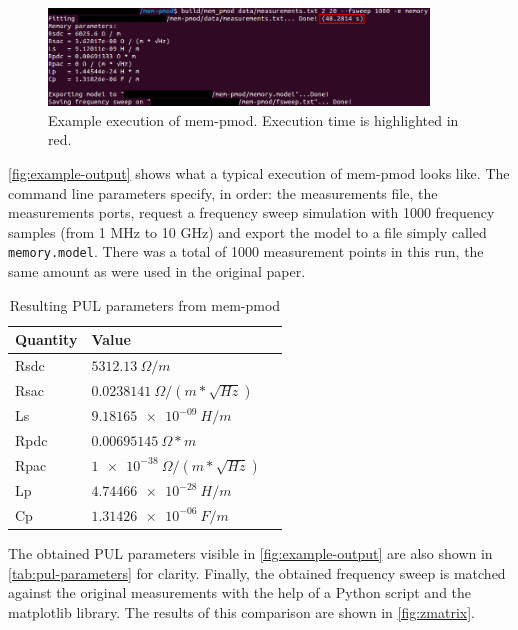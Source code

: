 \begin{figure}[htbp]
    \center
    \includegraphics[width = 0.9\textwidth]{img/example_output}
    \caption{Example execution of mem-pmod. Execution time is highlighted in red.}
    \label{fig:example-output}
\end{figure}
\autoref{fig:example-output} shows what a typical execution of mem-pmod looks like. The command line parameters specify, in order: the measurements file, the measurements ports, request a frequency sweep simulation with 1000 frequency samples (from 1 MHz to 10 GHz) and export the model to a file simply called \texttt{memory.model}. There was a total of 1000 measurement points in this run, the same amount as were used in the original paper.
\begin{table}[htbp]
    \center
    \begin{tabular}{|l|l|l|}
        \hline
        Quantity & Value \\ \hline
        Rsdc & $\SI{5312.13}{\Omega / m}$ \\ \hline
        Rsac & $\SI{0.0238141}{\Omega / (m * \sqrt{Hz})}$ \\ \hline
        Ls   & $\SI{9.18165e-09}{H / m}$ \\ \hline
        Rpdc & $\SI{0.00695145}{\Omega * m}$ \\ \hline
        Rpac & $\SI{1e-38}{\Omega / (m * \sqrt{Hz})}$ \\ \hline
        Lp   & $\SI{4.74466e-28}{H / m}$ \\ \hline
        Cp   & $\SI{1.31426e-06}{F / m}$ \\ \hline
    \end{tabular}
    \caption{Resulting PUL parameters from mem-pmod}
    \label{tab:pul-parameters}
\end{table}
The obtained PUL parameters visible in \autoref{fig:example-output} are also shown in \autoref{tab:pul-parameters} for clarity. Finally, the obtained frequency sweep is matched against the original measurements with the help of a Python script and the matplotlib library. The results of this comparison are shown in \autoref{fig:zmatrix}.

